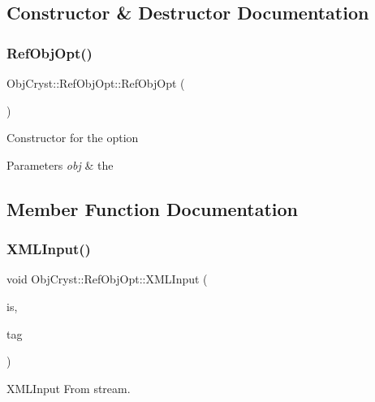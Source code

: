 \subsection{Constructor \& Destructor Documentation}
\mbox{\label{class_obj_cryst_1_1_ref_obj_opt_ad4fd60241264e22179c9ab33fc58867f}} 
\subsubsection{\texorpdfstring{RefObjOpt()}{RefObjOpt()}}
{\footnotesize\ttfamily Obj\+Cryst\+::\+Ref\+Obj\+Opt\+::\+Ref\+Obj\+Opt (\begin{DoxyParamCaption}{ }\end{DoxyParamCaption})}

Constructor for the option 
\begin{DoxyParams}{Parameters}
{\em obj} & the \\
\hline
\end{DoxyParams}


\subsection{Member Function Documentation}
\mbox{\label{class_obj_cryst_1_1_ref_obj_opt_a9562e469ee61a710e535594fe58f0744}} 
\subsubsection{\texorpdfstring{XMLInput()}{XMLInput()}}
{\footnotesize\ttfamily void Obj\+Cryst\+::\+Ref\+Obj\+Opt\+::\+X\+M\+L\+Input (\begin{DoxyParamCaption}\item[{istream \&}]{is,  }\item[{const \mbox{\hyperlink{class_obj_cryst_1_1_x_m_l_cryst_tag}{X\+M\+L\+Cryst\+Tag}} \&}]{tag }\end{DoxyParamCaption})}



X\+M\+L\+Input From stream. 

